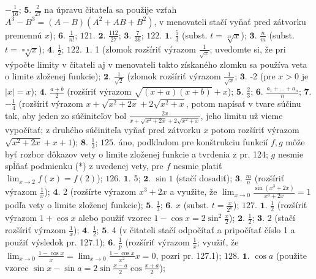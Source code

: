 $-\frac{1}{16}$;
$\boldsymbol{5.}$
$\frac{2}{27}$ na úpravu čitateľa sa použije vzťah $A^{3}-B^{3}=(A-B)(A^{2}+AB+B^{2}) $, v menovateli stačí vyňať pred zátvorku premennú $ x $);
$\boldsymbol{6.}$
$\frac{1}{n!}$;
$\boxed{121.}$
$\boldsymbol{2.}$
$\frac{112}{27}$;
$\boldsymbol{3.}$
$\frac{7}{36}$;
$\boxed{122.}$
$\boldsymbol{1.}$
$\frac{5}{3}$ (subst. $t=\sqrt[15]{x} $);
$\boldsymbol{3.}$
$\frac{n}{m}$ (subst. $t=\sqrt[m.n]{x} $);
$\boldsymbol{4.}$
$\frac{1}{2}$;
$\boxed{122.}$
$\boldsymbol{1.}$
1 (zlomok rozšíriť výrazom $\frac{1}{\sqrt{x}}$; uvedomte si, že pri výpočte limity v čitateli aj v menovateli takto získaného zlomku sa používa veta o limite zloženej funkcie);
$\boldsymbol{2.}$
$\frac{1}{\sqrt{2}}$ (zlomok rozšíriť výrazom $\frac{1}{\sqrt{x}}$;
$\boldsymbol{3.}$
-2 (pre $x>0$ je $\vert x \vert=x $);
$\boldsymbol{4.}$
$\frac{a+b}{2}$ (rozšíriť výrazom $\sqrt{(x+a)(x+b)}+x $);
$\boldsymbol{5.}$
$\frac{2}{3}$;
$\boldsymbol{6.}$
$\frac{a_{1}+...+a_{n}}{n}$;
$\boldsymbol{7.}$
$-\frac{1}{4}$ (rozšíriť výrazom $ x+\sqrt{x^{2}+2x}+2\sqrt{x^{2}+x}$, potom napísať v tvare súčinu tak, aby jeden zo súčiniteľov bol $ \frac{2x}{x+\sqrt{x^{2}+2x}+2\sqrt{x^{2}+x}}$, jeho limitu už vieme vypočítať; z druhého súčiniteľa vyňať pred zátvorku $ x $ potom rozšíriť výrazom $\sqrt{x^{2}+2x}+x+1 $);
$\boldsymbol{8.}$
$\frac{1}{3}$;
$\boxed{125.}$
áno, podkladom pre konštrukciu funkcií $f,g $ môže byť rozbor dôkazov vety o limite zloženej funkcie a tvrdenia z pr. 124; $g $ nesmie spĺňať podmienku (*) z uvedenej vety, pre $f$ nesmie platiť $\lim_{x \to 2}f(x) = f(2)$);
$\boxed{126.}$
$\boldsymbol{1.}$ 5;
$\boldsymbol{2.}$
$\sin 1$ (stačí dosadiť);
$\boldsymbol{3.}$
$\frac{m}{n}$ (rozšíriť výrazom $\frac{1}{x}$);
$\boldsymbol{4.}$ 2 (rozšírte výrazom $x^{3}+2x$ a využite, že  $\lim_{x \to 0}\frac{\sin (x^{3}+2x)}{x^{3}+2x} = 1$ podľa vety o limite zloženej funkcie);
$\boldsymbol{5.}$
$\frac{1}{3}$;
$\boldsymbol{6.}$ $x$ (subst. $t= \frac{x}{2^{n}} $);
$\boxed{127.}$
$\boldsymbol{1.}$
$\frac{1}{2} $ (rozšíriť výrazom $1+ \cos x $ alebo použiť vzorec $1-\cos x =2 \sin ^{2}\frac{x}{2}$);
$\boldsymbol{2.}$
$\frac{1}{2} $;
$\boldsymbol{3.}$ 2 (stačí rozšíriť  výrazom $\frac{1}{x} $);
$\boldsymbol{4.}$
$\frac{1}{2} $;
$\boldsymbol{5.}$ 4 (v čitateli stačí odpočítať a pripočítať číslo 1 a použiť výsledok pr. 127.1);
$\boldsymbol{6.}$
$\frac{1}{p} $ (rozšíriť výrazom $\frac{1}{x} $; využiť, že $\lim_{x \to 0}\frac{1-\cos x}{x} = \lim_{x \to 0}\frac{1-\cos x}{x^{2}}x=0$, pozri pr. 127.1);
$\boxed{128.}$
$\boldsymbol{1.}$ $\cos a $ (použite vzorec $\sin x- \sin a = 2 \sin \frac{x-a}{2} \cos \frac{x+a}{2} $);
